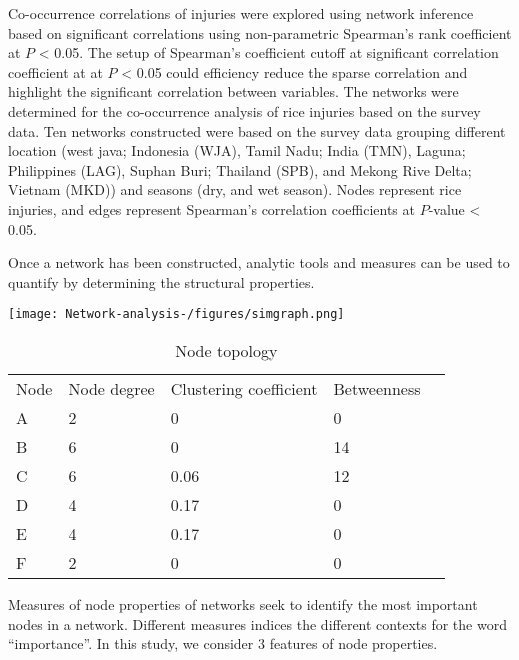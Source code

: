 Co-occurrence correlations of injuries were explored using network inference based on significant correlations using non-parametric Spearman’s rank coefficient at $P$ < 0.05. The setup of Spearman's coefficient cutoff at significant correlation coefficient at at $P$ < 0.05 could efficiency reduce the sparse correlation and highlight the significant correlation between variables. The networks were determined for the co-occurrence analysis of rice injuries based on the survey data. Ten networks constructed were based on the survey data grouping different location (west java; Indonesia (WJA), Tamil Nadu; India (TMN), Laguna; Philippines (LAG), Suphan Buri; Thailand (SPB), and Mekong Rive Delta; Vietnam (MKD)) and seasons (dry, and wet season). Nodes represent rice injuries, and edges represent Spearman's correlation coefficients at $P$-value < 0.05. 

Once a network has been constructed, analytic tools and measures can be used to quantify by determining the structural properties.

\texttt{[image: Network-analysis-/figures/simgraph.png]}

\begin{table}
\centering
\caption{Node topology}
\begin{tabular}{lllll}
Node & Node degree & Clustering coefficient & Betweenness   \\
A    & 2           & 0                      & 0             \\
B    & 6           & 0                      & 14            \\
C    & 6           & 0.06                   & 12            \\
D    & 4           & 0.17                   & 0             \\
E    & 4           & 0.17                   & 0             \\
F    & 2           & 0                      & 0            
\end{tabular}
\end{table}

Measures of node properties of networks seek to identify the most important nodes in a network. Different measures indices the different contexts for the word ``importance''. In this study, we consider 3 features of node properties. 

